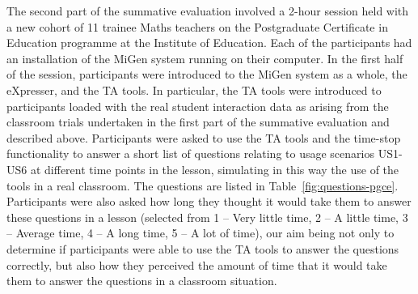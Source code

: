 The second part of the summative evaluation involved a 2-hour session
held with a new cohort of 11 trainee Maths teachers on the
Postgraduate Certificate in Education programme at the Institute of Education. 
Each of the participants had an installation of the MiGen system running on
their computer. In the first half of the session, participants were
introduced to the MiGen system as a whole, the
eXpresser, and the TA tools. In particular, the TA tools were
introduced to participants loaded with the real student interaction
data as arising from the classroom trials undertaken in the first part
of the summative evaluation and described above. Participants were
asked to use the TA tools and the time-stop functionality to
answer a short list of questions relating to usage scenarios US1-US6
at different time points in the lesson, simulating in this
way the use of the tools in a real classroom.
The questions are listed in Table~\ref{fig:questions-pgce}. 
Participants were also asked how long they thought it would take them to
answer these questions in a lesson
(selected from 1 -- Very little time,
2 -- A little time,
3 -- Average time, 
4 -- A long time, 
5 -- A lot of time),
our aim being not only to
determine if participants were able to use the TA tools to answer the
questions correctly, but also how they perceived the amount of time that it
would take them to answer the questions in a classroom situation. 

